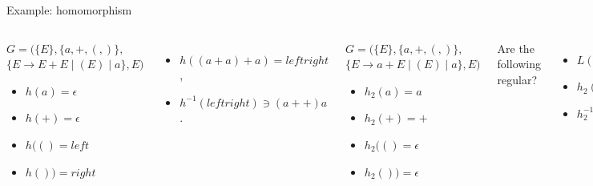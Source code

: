 \documentclass[handout]{beamer}
\begin{document}
  
\begin{frame}{Example: homomorphism}
        
    \begin{columns}

    
        \begin{example}
            $G=(\{E\},\{a,+,(,)\},$ $\{E\rightarrow E+E\mid (E)\mid a\},E)$        
            \begin{itemize}            
                \item $h(a)=\epsilon$
                \item $h(+)=\epsilon$
                \item $h(()=left$
                \item $h())=right$               
            \end{itemize}
        \end{example}
        \begin{itemize}
            \item $h((a+a)+a)=leftright $,
            \item $h^{-1}(leftright)\ni (a++)a$.
        \end{itemize}

        \vspace{1.75cm}
    

        \begin{example}
            $G=(\{E\},\{a,+,(,)\},$ $\{E\rightarrow a+E\mid (E)\mid a\},E)$
            \begin{itemize}
                \item $h_2(a)=a$
                \item $h_2(+)=+$
                \item $h_2(()=\epsilon$
                \item $h_2())=\epsilon$
            \end{itemize}
        \end{example}
        Are the following regular?
        \begin{itemize}
            \item $L(G)$
            \item $h_2(L(G))$
            \item $h_2^{-1}(h(L(G)))$
        \end{itemize}
        Is $h_2^{-1}(h_2(L(G)))=L(G)$?       
        
    \end{columns}
            
\end{frame}
\end{document}
